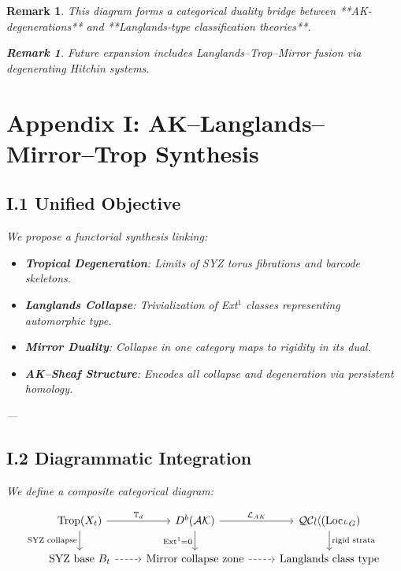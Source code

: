\documentclass[11pt]{article}
\newtheorem{remark}[theorem]{Remark}
\begin{document}
\begin{remark}
This diagram forms a categorical duality bridge  
between **AK-degenerations** and **Langlands-type classification theories**.

\begin{remark}
Future expansion includes Langlands–Trop–Mirror fusion via degenerating Hitchin systems.
\end{remark}

\section*{Appendix I: AK–Langlands–Mirror–Trop Synthesis}

\subsection*{I.1 Unified Objective}

We propose a functorial synthesis linking:

\begin{itemize}
  \item \textbf{Tropical Degeneration}: Limits of SYZ torus fibrations and barcode skeletons.
  \item \textbf{Langlands Collapse}: Trivialization of Ext$^1$ classes representing automorphic type.
  \item \textbf{Mirror Duality}: Collapse in one category maps to rigidity in its dual.
  \item \textbf{AK–Sheaf Structure}: Encodes all collapse and degeneration via persistent homology.
\end{itemize}

---

\subsection*{I.2 Diagrammatic Integration}

We define a composite categorical diagram:

\[
\begin{tikzcd}
\mathrm{Trop}(X_t) \arrow[r, "\mathbb{T}_d"] \arrow[d, "\text{SYZ collapse}"'] &
D^b(\mathcal{AK}) \arrow[r, "\mathcal{L}_{AK}"] \arrow[d, "\mathrm{Ext}^1 = 0"'] &
\mathcal{QCoh}(\mathrm{Loc}_{^LG}) \arrow[d, "\text{rigid strata}"] \\
\text{SYZ base } B_t \arrow[r, dashed] &
\text{Mirror collapse zone} \arrow[r, dashed] &
\text{Langlands class type}
\end{tikzcd}
\]


\end{remark}
\end{document}
